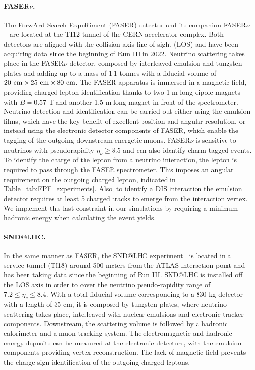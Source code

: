 \paragraph{FASER$\nu$.}
%
The ForwArd Search ExpeRiment (FASER) detector
and its companion FASER$\nu$~\cite{FASER:2019aik,FASER:2019dxq,FASER:2023zcr,FASER:2022hcn}
are located at the TI12 tunnel of the CERN accelerator complex.
%
Both detectors are aligned
with the collision axis line-of-sight (LOS)
and have been acquiring data since the beginning of Run III in 2022.
%
Neutrino scattering takes place in the FASER$\nu$ 
detector, composed by interleaved emulsion and tungsten plates and
adding up to a mass of 1.1 tonnes with a fiducial volume of $20~\rm{cm} \times 25~\rm{cm} \times 80~{\rm cm}$.
%
The FASER apparatus is immersed in a magnetic field,  providing charged-lepton
identification thanks to two 1 m-long dipole magnets with $B=0.57$ T
and another 1.5 m-long magnet in front of the spectrometer. 
%
Neutrino detection and identification can be carried out either using the emulsion
films, which have the key benefit of excellent position and angular resolution,
or instead using the electronic detector components of FASER, which enable the tagging
of the outgoing downstream energetic muons.
%
FASER$\nu$ is sensitive to neutrinos with pseudorapidity $\eta_\nu \ge 8.5$
and can also identify charm-tagged events.
%
To identify the charge of the lepton from a neutrino interaction, the lepton is required to pass through the FASER spectrometer.
%
This imposes an angular requirement on the outgoing charged lepton, indicated
in Table~\ref{tab:FPF_experiments}.
%
Also, to identify a DIS interaction the emulsion detector requires at least 5 charged tracks
to emerge from the interaction vertex.
%
We implement this last constraint
in our simulations by requiring a minimum hadronic energy when calculating the event yields. 

\paragraph{SND@LHC.}
%
In the same manner as FASER, the SND@LHC experiment~\cite{SNDLHC:2022ihg}
is located in a service tunnel (TI18)
around 500 meters from the ATLAS interaction point and has been taking data
since the  beginning of Run III.
%
SND@LHC is installed off the LOS axis in order to cover the neutrino
pseudo-rapidity range of $7.2 \le \eta_\nu \le 8.4$.
%
With a total fiducial volume corresponding to a 830 kg detector with a length of 35 cm, it is composed by tungsten plates,
where neutrino scattering takes place, interleaved with nuclear emulsions and electronic tracker
components.
%
Downstream, the scattering volume is followed by a hadronic calorimeter and a muon tracking system.
%
The electromagnetic
 and hadronic energy deposits can be measured at the electronic detectors, with the emulsion
 components providing vertex reconstruction.
 The lack of magnetic field prevents the charge-sign identification of the outgoing charged leptons.

